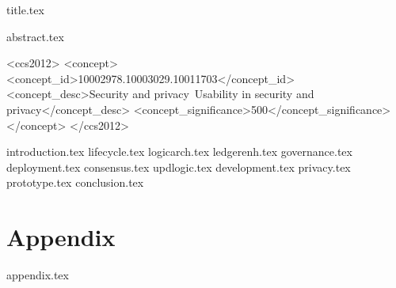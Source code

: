 \documentclass[sigconf, anonymous]{acmart}
\begin{document}
{title.tex}


{abstract.tex}



\begin{CCSXML}
<ccs2012>
<concept>
<concept_id>10002978.10003029.10011703</concept_id>
<concept_desc>Security and privacy~Usability in security and privacy</concept_desc>
<concept_significance>500</concept_significance>
</concept>
</ccs2012>
\end{CCSXML}





{introduction.tex}
{lifecycle.tex}
{logicarch.tex}
{ledgerenh.tex}
{governance.tex}
{deployment.tex}
{consensus.tex}
{updlogic.tex}
{development.tex}
{privacy.tex}
{prototype.tex}
{conclusion.tex}


\ifshort\else
\appendix
\section*{Appendix}
{appendix.tex}
\fi



\end{document}
